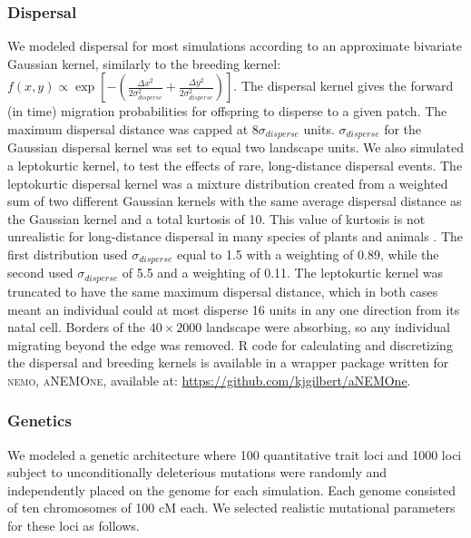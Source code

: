 \subsubsection*{Dispersal}
We modeled dispersal for most simulations according to an approximate bivariate Gaussian kernel, similarly to the breeding kernel: $f(x,y) \propto \exp{[-(\frac{\Delta x^2}{2\sigma_{disperse}^2}+\frac{\Delta y^2}{2\sigma_{disperse}^2})]}$. The dispersal kernel gives the forward (in time) migration probabilities for offspring to disperse to a given patch. The maximum dispersal distance was capped at $8\sigma_{disperse}$ units. $\sigma_{disperse}$ for the Gaussian dispersal kernel was set to equal two landscape units. We also simulated a leptokurtic kernel, to test the effects of rare, long-distance dispersal events. The leptokurtic dispersal kernel was a mixture distribution created from a weighted sum of two different Gaussian kernels \citep{Ibrahim:1996} with the same average dispersal distance as the Gaussian kernel and a total kurtosis of 10. This value of kurtosis is not unrealistic for long-distance dispersal in many species of plants and animals \citep{Guttal:2011, Lowe:2009, Skalski:2000}. The first distribution used $\sigma_{disperse}$ equal to 1.5 with a weighting of 0.89, while the second used $\sigma_{disperse}$ of 5.5 and a weighting of 0.11. The leptokurtic kernel was truncated to have the same maximum dispersal distance, which in both cases meant an individual could at most disperse 16 units in any one direction from its natal cell. Borders of the $40\times2000$ landscape were absorbing, so any individual migrating beyond the edge was removed. R code for calculating and discretizing the dispersal and breeding kernels is available in a wrapper package written for \textsc{nemo}, \textsc{aNEMOne}, available at: \url{https://github.com/kjgilbert/aNEMOne}.


\subsubsection*{Genetics}
We modeled a genetic architecture where 100 quantitative trait loci and 1000 loci subject to unconditionally deleterious mutations were randomly and independently placed on the genome for each simulation. Each genome consisted of ten chromosomes of 100 cM each. We selected realistic mutational parameters for these loci as follows.

